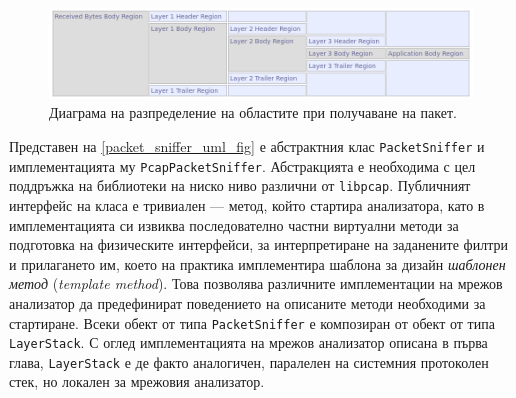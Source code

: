 \documentclass[12pt,a4paper,oneside]{book}
\begin{document}
\begin{figure}[h!]
  \centering
  \includegraphics[width=\textwidth]{figures/sniffed_packet_regions.png}
  \caption{Диаграма на разпределение на областите при получаване на пакет.}
  \label{sniffed_packet_regions_fig}
\end{figure}

Представен на \autoref{packet_sniffer_uml_fig} е абстрактния клас
\texttt{PacketSniffer} и имплементацията му \texttt{PcapPacketSniffer}.
Абстракцията е необходима с цел поддръжка на библиотеки на ниско ниво различни
от \texttt{libpcap}.  Публичният интерфейс на класа е тривиален --- метод,
който стартира анализатора, като в имплементацията си извиква последователно
частни виртуални методи за подготовка на физическите интерфейси, за
интерпретиране на заданените филтри и прилагането им, което на практика
имплементира шаблона за дизайн \textit{шаблонен метод} (\textit{template method}).
\cite{gamma_design_1995} Това позволява
различните имплементации на мрежов анализатор да предефинират поведението на
описаните методи необходими за стартиране.
Всеки обект от типа \texttt{PacketSniffer} е композиран от обект от типа
\texttt{LayerStack}. С оглед имплементацията на мрежов анализатор описана в
първа глава, \texttt{LayerStack} е де факто аналогичен, паралелен на системния
протоколен стек, но локален за мрежовия анализатор.
\end{document}
